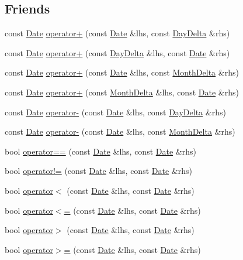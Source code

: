 \subsection*{\-Friends}
\begin{DoxyCompactItemize}
\item 
const \hyperlink{structDate}{\-Date} \hyperlink{structDate_a88a01e03ad6e96a22ee81ed7a38bdd5a}{operator+} (const \hyperlink{structDate}{\-Date} \&lhs, const \hyperlink{structDayDelta}{\-Day\-Delta} \&rhs)
\item 
const \hyperlink{structDate}{\-Date} \hyperlink{structDate_a064b881a2d6c0460119fee5d230c28e4}{operator+} (const \hyperlink{structDayDelta}{\-Day\-Delta} \&lhs, const \hyperlink{structDate}{\-Date} \&rhs)
\item 
const \hyperlink{structDate}{\-Date} \hyperlink{structDate_a0c895c337e87874cc232482d703db30e}{operator+} (const \hyperlink{structDate}{\-Date} \&lhs, const \hyperlink{structMonthDelta}{\-Month\-Delta} \&rhs)
\item 
const \hyperlink{structDate}{\-Date} \hyperlink{structDate_a7650e3aaeb267ba50ea3b3541e067e35}{operator+} (const \hyperlink{structMonthDelta}{\-Month\-Delta} \&lhs, const \hyperlink{structDate}{\-Date} \&rhs)
\item 
const \hyperlink{structDate}{\-Date} \hyperlink{structDate_a10a73b5010e589b98f3929f9b36e2387}{operator-\/} (const \hyperlink{structDate}{\-Date} \&lhs, const \hyperlink{structDayDelta}{\-Day\-Delta} \&rhs)
\item 
const \hyperlink{structDate}{\-Date} \hyperlink{structDate_a61933f732562f4d15602110136ad536c}{operator-\/} (const \hyperlink{structDate}{\-Date} \&lhs, const \hyperlink{structMonthDelta}{\-Month\-Delta} \&rhs)
\item 
bool \hyperlink{structDate_a27425be265a0cc57e4f731825154ec4d}{operator==} (const \hyperlink{structDate}{\-Date} \&lhs, const \hyperlink{structDate}{\-Date} \&rhs)
\item 
bool \hyperlink{structDate_ad12683e4457513f4f834e13c4e7f72f8}{operator!=} (const \hyperlink{structDate}{\-Date} \&lhs, const \hyperlink{structDate}{\-Date} \&rhs)
\item 
bool \hyperlink{structDate_a611ba98c72bec2ae82bbf086b81563ef}{operator$<$} (const \hyperlink{structDate}{\-Date} \&lhs, const \hyperlink{structDate}{\-Date} \&rhs)
\item 
bool \hyperlink{structDate_acacb699d0fcffd2443c121586b7c22da}{operator$<$=} (const \hyperlink{structDate}{\-Date} \&lhs, const \hyperlink{structDate}{\-Date} \&rhs)
\item 
bool \hyperlink{structDate_a4e4faf476e7d66ef88aaca8b11a60175}{operator$>$} (const \hyperlink{structDate}{\-Date} \&lhs, const \hyperlink{structDate}{\-Date} \&rhs)
\item 
bool \hyperlink{structDate_aa72d3f6e17c7aab4d16e9e50b5069e1a}{operator$>$=} (const \hyperlink{structDate}{\-Date} \&lhs, const \hyperlink{structDate}{\-Date} \&rhs)
\end{DoxyCompactItemize}


